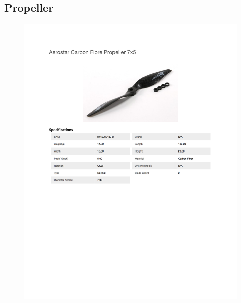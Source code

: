 \documentclass[../main.tex]{subfiles}
\begin{document}
\subsection{Propeller \cite{Propeller}} \label{propeller}
\begin{figure}[H]
	\centering
	\includegraphics[width=\textwidth]{img/specs/propeller.pdf}
\end{figure}

\enlargethispage{31pt}
\end{document}
